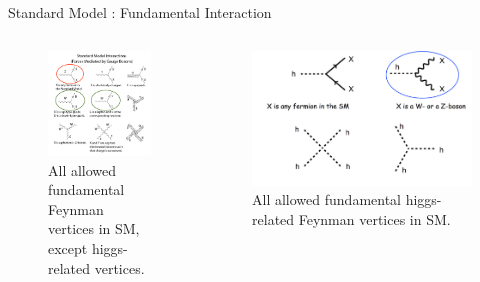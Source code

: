 \documentclass[mathserif,serif]{beamer}
\begin{document}
\begin{frame}{Standard Model : Fundamental Interaction}
\begin{columns}

\begin{column}{0.5\textwidth}
\begin{figure}
\centering
\includegraphics[width=\textwidth]{data/photo/theory/vertices_SM_circle.png}
\caption{All allowed fundamental Feynman vertices in SM, except higgs-related vertices.}
\end{figure}

\end{column}

\begin{column}{0.5\textwidth}
\begin{figure}
\centering
\includegraphics[width=\textwidth]{data/photo/theory/vertices_higgs_circle.png}
\caption{All allowed fundamental higgs-related Feynman vertices in SM.}
\end{figure}
\end{column}

\end{columns}
\end{frame}
\end{document}
